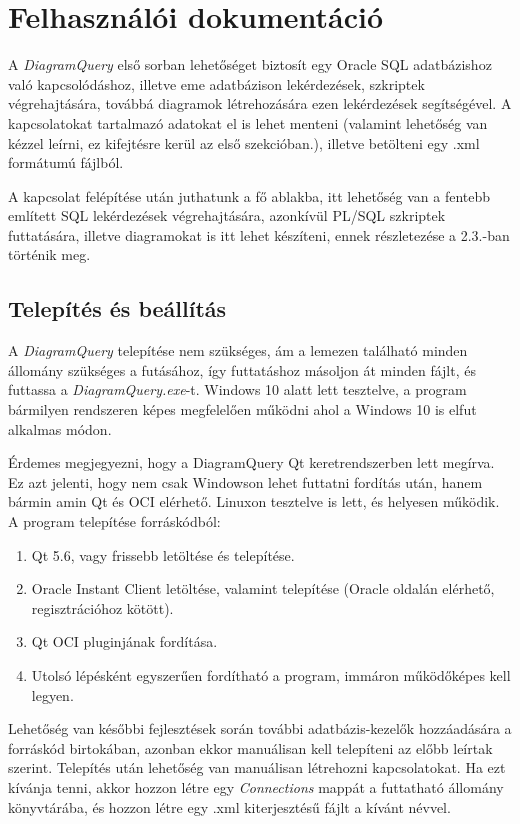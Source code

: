 \chapter{Felhasználói dokumentáció}
A \textit{DiagramQuery} első sorban lehetőséget biztosít egy Oracle SQL adatbázishoz való kapcsolódáshoz, illetve
eme adatbázison lekérdezések, szkriptek végrehajtására, továbbá diagramok létrehozására ezen lekérdezések
segítségével.
A kapcsolatokat tartalmazó adatokat el is lehet menteni (valamint lehetőség van kézzel leírni,
ez kifejtésre kerül az első szekcióban.), illetve betölteni egy .xml formátumú fájlból.

A kapcsolat felépítése után juthatunk a fő ablakba, itt lehetőség van a fentebb említett SQL lekérdezések végrehajtására, 
azonkívül PL/SQL szkriptek futtatására,
illetve diagramokat is itt lehet készíteni, ennek részletezése a 2.3.-ban történik meg.

\section{Telepítés és beállítás}
A \textit{DiagramQuery} telepítése nem szükséges, ám a lemezen található minden állomány szükséges a futásához,
így futtatáshoz másoljon át minden fájlt, és futtassa a \textit{DiagramQuery.exe}-t.
Windows 10 alatt lett tesztelve, a program bármilyen rendszeren képes megfelelően működni ahol a
Windows 10 is elfut alkalmas módon.

Érdemes megjegyezni, hogy a DiagramQuery Qt keretrendszerben lett megírva. Ez azt jelenti, hogy nem csak Windowson lehet
futtatni fordítás után, hanem bármin amin Qt és OCI elérhető. Linuxon tesztelve is lett, és helyesen működik. A program telepítése
forráskódból:
\begin{enumerate}
  \item Qt 5.6, vagy frissebb letöltése és telepítése.
  \item Oracle Instant Client letöltése, valamint telepítése (Oracle oldalán elérhető, regisztrációhoz kötött).
  \item Qt OCI pluginjának fordítása.
  \item Utolsó lépésként egyszerűen fordítható a program, immáron működőképes kell legyen.
\end{enumerate}

Lehetőség van későbbi fejlesztések során további adatbázis-kezelők hozzáadására a forráskód birtokában, azonban ekkor
manuálisan kell telepíteni az előbb leírtak szerint.
Telepítés után lehetőség van manuálisan létrehozni kapcsolatokat. Ha ezt kívánja tenni, akkor hozzon létre egy
\textit{Connections} mappát a futtatható állomány könyvtárába, és hozzon létre egy .xml kiterjesztésű fájlt a kívánt névvel.

